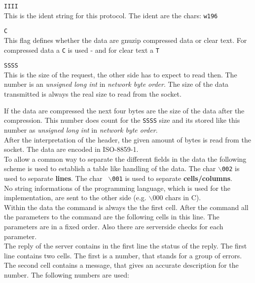 \documentclass[a4paper,10pt]{article}
\begin{document}
\begin{description}

\item {\tt IIII}\\
This is the ident string for this protocol. The ident are the chars: {\tt w196} \\

\item {\tt C}\\
This flag defines whether the data are gnuzip compressed data or clear text.
For compressed data a {\tt C} is used - and for clear text a {\tt T}

\item {\tt SSSS}\\
This is the size of the request, the other side has to expect to read then.
The number is an {\it unsigned long int} in {\it network byte order}.  The
size of the data transmitted is always the real size to read from the socket.

\end{description}

If the data are compressed the next four bytes are the size of the data after
the compression. This number does count for the {\tt SSSS} size and its stored
like this number as {\it unsigned long int} in {\it network byte order}.\\

After the interpretation of the header, the given amount of bytes is read from
the socket. The data are encoded in ISO-8859-1.\\

To allow a common way to separate the different fields in the data the
following scheme is used to establish a table like handling of the data. The
char {\tt $\backslash$002} is used to separate {\bf lines}. The char {\tt
$\backslash$001} is used to separate {\bf cells/columns}.\\

No string informations of the programming language, which is used for the
implementation, are sent to the other side (e.g. $\backslash$000 chars in
C).\\

Within the data the command is always the the first cell. After the command
all the parameters to the command are the following cells in this line. The
parameters are in a fixed order. Also there are serverside checks for each
parameter.\\

The reply of the server contains in the first line the status of the reply.
The first line contains two cells. The first is a number, that stands for a
group of errors. The second cell contains a message, that gives an accurate
description for the number. The following numbers are used:\\
\end{document}
